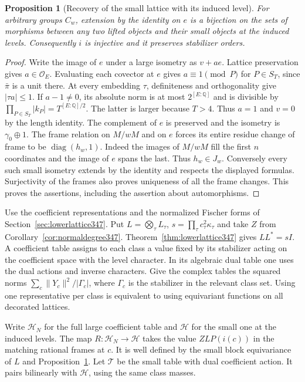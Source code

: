 \documentclass[a4paper,11pt]{article}
\newtheorem{proposition}{Proposition}[section]
\theoremstyle{definition}
\theoremstyle{remark}
\numberwithin{equation}{section}
\begin{document}
\begin{proposition}[Recovery of the small lattice with its induced level]
\leavevmode\label{prop:liftclasses380}
For arbitrary groups \(C_w\), extension by the identity on \(e\)
is a bijection on the sets of morphisms between any two lifted
objects and their small objects at the induced levels.
Consequently \(i\) is injective and it preserves stabilizer orders.
\end{proposition}
\begin{proof}
Write the image of \(e\) under a large isometry as \(v+a e\).
Lattice preservation gives \(a\in\mathcal O_E\).
Evaluating each covector at \(e\) gives \(a\equiv1\pmod P\)
for \(P\in S_T\), since \(\bar\pi\) is a unit there. At every
embedding \(\tau\), definiteness and orthogonality give
\(|\tau a|\le1\). If \(a-1\ne0\), its absolute norm is at
most \(2^{[E:\mathbb Q]}\) and is divisible by
\(\prod_{P\in S_T}|k_P|=T^{[E:\mathbb Q]/2}\).
The latter is larger because \(T>4\). Thus \(a=1\) and
\(v=0\) by the length identity. The complement of \(e\) is
preserved and the isometry is \(\gamma_0\oplus1\).
The frame relation on \(M/wM\) and on \(e\) forces its entire
residue change of frame to be \(\operatorname{diag}(h_w,1)\).
Indeed the images of \(M/wM\) fill the first \(n\) coordinates
and the image of \(e\) spans the last. Thus \(h_w\in J_w\).
Conversely every such small isometry extends by the identity
and respects the displayed formulas. Surjectivity of the frames
also proves uniqueness of all the frame changes. This proves
the assertions, including the assertion about automorphisms.
\end{proof}

Use the coefficient representations and the normalized Fischer
forms of Section~\ref{sec:lowerlattice347}. Put
\(L=\bigotimes_\tau L_\tau\), \(s=\prod_\tau c_\tau^2\kappa_\tau\)
and take \(Z\) from Corollary~\ref{cor:normaldegree347}.
Theorem~\ref{thm:lowerlattice347} gives \(LL^*=sI\).
A coefficient table assigns to each class a value fixed by
its stabilizer acting on the coefficient space with the level
character. In its algebraic dual table one uses the dual
actions and inverse characters. Give the complex tables the
squared norms \(\sum_c\|Y_c\|^2/|\Gamma_c|\), where
\(\Gamma_c\) is the stabilizer in the relevant class set.
Using one representative per class is equivalent to using
equivariant functions on all decorated lattices.

Write \(\mathcal H_N\) for the full large coefficient table
and \(\mathcal H\) for the small one at the induced levels.
The map \(R:\mathcal H_N\to\mathcal H\) takes the value
\(ZL P(i(c))\) in the matching rational frames at \(c\).
It is well defined by the small block equivariance of \(L\)
and Proposition~\ref{prop:liftclasses380}. Let \(\mathcal T\)
be the small table with dual coefficient action. It pairs
bilinearly with \(\mathcal H\), using the same class masses.
\end{document}
